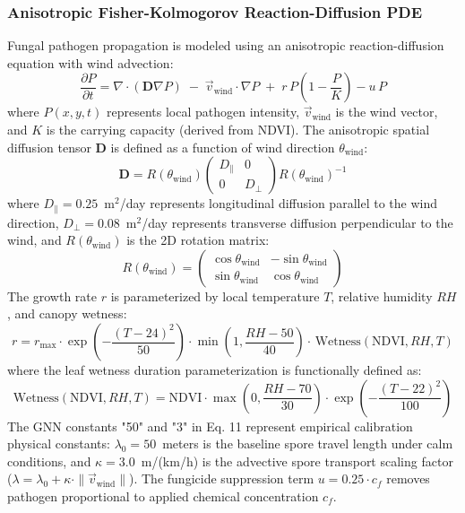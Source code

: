 \documentclass[review,3p,times,authoryear]{elsarticle}
\begin{document}
\subsubsection{Anisotropic Fisher-Kolmogorov Reaction-Diffusion PDE}
Fungal pathogen propagation is modeled using an anisotropic reaction-diffusion equation with wind advection:
\begin{equation}
\frac{\partial P}{\partial t} = \nabla \cdot (\mathbf{D} \nabla P) \;-\; \vec{v}_\text{wind} \cdot \nabla P \;+\; r\,P\!\left(1 - \frac{P}{K}\right) - u\,P
\end{equation}
where $P(x,y,t)$ represents local pathogen intensity, $\vec{v}_\text{wind}$ is the wind vector, and $K$ is the carrying capacity (derived from NDVI). The anisotropic spatial diffusion tensor $\mathbf{D}$ is defined as a function of wind direction $\theta_\text{wind}$:
\begin{equation}
\mathbf{D} = R(\theta_\text{wind}) \begin{pmatrix} D_{\parallel} & 0 \\ 0 & D_{\perp} \end{pmatrix} R(\theta_\text{wind})^{-1}
\end{equation}
where $D_{\parallel} = 0.25$~m$^2$/day represents longitudinal diffusion parallel to the wind direction, $D_{\perp} = 0.08$~m$^2$/day represents transverse diffusion perpendicular to the wind, and $R(\theta_\text{wind})$ is the 2D rotation matrix:
\begin{equation}
R(\theta_\text{wind}) = \begin{pmatrix} \cos\theta_\text{wind} & -\sin\theta_\text{wind} \\ \sin\theta_\text{wind} & \cos\theta_\text{wind} \end{pmatrix}
\end{equation}
The growth rate $r$ is parameterized by local temperature $T$, relative humidity $RH$, and canopy wetness:
\begin{equation}
r = r_\text{max} \cdot \exp\!\left(-\frac{(T - 24)^2}{50}\right) \cdot \min\!\left(1,\frac{RH - 50}{40}\right) \cdot \,\text{Wetness}(\text{NDVI}, RH, T)
\end{equation}
where the leaf wetness duration parameterization is functionally defined as:
\begin{equation}
\text{Wetness}(\text{NDVI}, RH, T) = \text{NDVI} \cdot \max\!\left(0, \frac{RH - 70}{30}\right) \cdot \exp\!\left(-\frac{(T - 22)^2}{100}\right)
\end{equation}
The GNN constants "50" and "3" in Eq. 11 represent empirical calibration physical constants: $\lambda_0 = 50$~meters is the baseline spore travel length under calm conditions, and $\kappa = 3.0$~m/(km/h) is the advective spore transport scaling factor ($\lambda = \lambda_0 + \kappa \cdot \|\vec{v}_\text{wind}\|$).
The fungicide suppression term $u = 0.25 \cdot c_f$ removes pathogen proportional to applied chemical concentration $c_f$.
\end{document}
